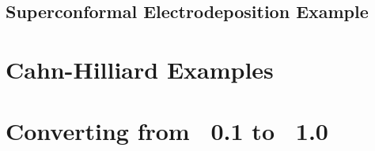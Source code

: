 \documentclass[letterpaper,twoside,openright,10pt]{memoir}
\begin{document}
\newpage
\section*{Superconformal Electrodeposition Example}






\chapter{Cahn-Hilliard Examples}



\chapter{Converting from \FiPy{}~0.1 to \FiPy{}~1.0}
\label{chap:Update0.1to1.0}




\backmatter

\end{document}
